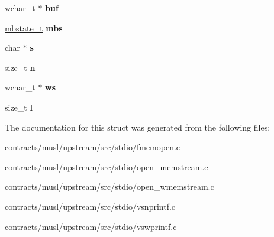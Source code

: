 \begin{DoxyCompactItemize}
\item 
\mbox{\label{structcookie_a066fa6a5f1734246b28ec0274667aa53}} 
wchar\+\_\+t $\ast$ {\bfseries buf}
\item 
\mbox{\label{structcookie_a445f2fcb8af3d598ccf61f91f390bebd}} 
\mbox{\hyperlink{struct____mbstate__t}{mbstate\+\_\+t}} {\bfseries mbs}
\item 
\mbox{\label{structcookie_a97c501cdd25ab5460742396978a3100d}} 
char $\ast$ {\bfseries s}
\item 
\mbox{\label{structcookie_a09b95a25b460316709f36dd8d22bb651}} 
size\+\_\+t {\bfseries n}
\item 
\mbox{\label{structcookie_a64aefcf2b3f35dabb45e4c12f8ac27ab}} 
wchar\+\_\+t $\ast$ {\bfseries ws}
\item 
\mbox{\label{structcookie_aa2546d71022abcdc1c3195c7a1ab005e}} 
size\+\_\+t {\bfseries l}
\end{DoxyCompactItemize}


The documentation for this struct was generated from the following files\+:\begin{DoxyCompactItemize}
\item 
contracts/musl/upstream/src/stdio/fmemopen.\+c\item 
contracts/musl/upstream/src/stdio/open\+\_\+memstream.\+c\item 
contracts/musl/upstream/src/stdio/open\+\_\+wmemstream.\+c\item 
contracts/musl/upstream/src/stdio/vsnprintf.\+c\item 
contracts/musl/upstream/src/stdio/vswprintf.\+c\end{DoxyCompactItemize}
